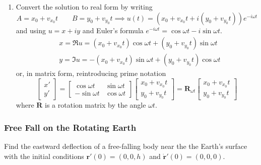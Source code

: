 \documentclass[11pt, a4paper]{article}
\begin{document}
\begin{enumerate}
	\item Convert the solution to real form by writing 
	\begin{equation*}
		A = x_0 + v_{x_0}t \qquad B = y_0 + v_{y_0}t \implies u(t) = (x_0 + v_{x_0}t + i(y_0 + v_{y_0}t))e^{-i\omega t}
	\end{equation*}
	and using $ u = x + iy $ and Euler's formula $ e^{-i \omega t} = \cos \omega t - i\sin \omega t $. 
	\begin{align*}
		&x = \Re u = (x_0 + v_{x_0}t)\cos \omega t + (y_0 + v_{y_0}t) \sin \omega t\\
		&y = \Im u = - (x_0 + v_{x_0}t) \sin \omega t + (y_0 + v_{y_0}t) \cos \omega t
	\end{align*}
	or, in matrix form, reintroducing prime notation
	\[
		\begin{bmatrix}
			x'\\
			y'
		\end{bmatrix}
		= 
		\begin{bmatrix}
			\cos \omega t & \sin \omega t\\
			-\sin \omega t & \cos \omega t
		\end{bmatrix}
		\begin{bmatrix}
			x_0 + v_{x_0}t\\
			y_0 + v_{y_0}t
		\end{bmatrix}
		= \mathbf{R}_{\omega t}
		 \begin{bmatrix}
			x_0 + v_{x_0}t\\
			y_0 + v_{y_0}t
		\end{bmatrix}
	\]
	where $ \mathbf{R} $ is a rotation matrix by the angle $ \omega t $.

	
\end{enumerate}

\subsubsection{Free Fall on the Rotating Earth}
Find the eastward deflection of a free-falling body near the the Earth's surface with the initial conditions $ \bm{r}'(0) = (0, 0, h) $ and $ \dot{\bm{r}}'(0) = (0, 0, 0) $.
\end{document}
